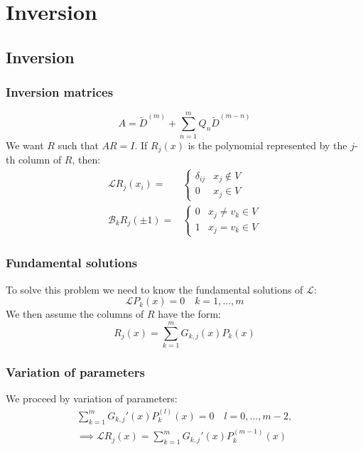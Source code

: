 \documentclass{beamer}
\begin{document}
\section{Inversion}

\subsection{Inversion}

\begin{frame}
\frametitle{Inversion matrices}
\begin{equation*}
A = \tilde{D}^{(m)} + \sum_{n=1}^m Q_n \tilde{D}^{(m-n)}
\end{equation*}
We want $R$ such that $AR = I$.
If $R_j(x)$ is the polynomial represented by the $j$-th column of $R$, then:
\begin{align*}
\mathcal{L} R_j(x_i) = & \begin{cases} \delta_{ij} & x_j \notin V \\ 0 & x_j \in V \end{cases} \\
\mathcal{B}_k R_j(\pm 1) = & \begin{cases} 0 & x_j \neq v_k \in V \\ 1 & x_j = v_k \in V \end{cases}
\end{align*}
\end{frame}

\begin{frame}
\frametitle{Fundamental solutions}
To solve this problem we need to know the fundamental solutions of $\mathcal{L}$:
\begin{equation*}
\mathcal{L} P_k(x) = 0 \quad k = 1,...,m
\end{equation*}
We then assume the columns of $R$ have the form:
\begin{equation*}
R_j(x) = \sum_{k=1}^m G_{k,j}(x) P_k(x)
\end{equation*}
\end{frame}

\begin{frame}
\frametitle{Variation of parameters}
We proceed by variation of parameters:
\begin{align*}
\sum_{k=1}^m G_{k,j}'(x) P_k^{(l)}(x) = 0 \quad l = 0,...,m-2, \\
\implies \mathcal{L} R_j(x) = \sum_{k=1}^m G_{k,j}'(x) P_k^{(m-1)}(x)
\end{align*}
\end{frame}
\end{document}
